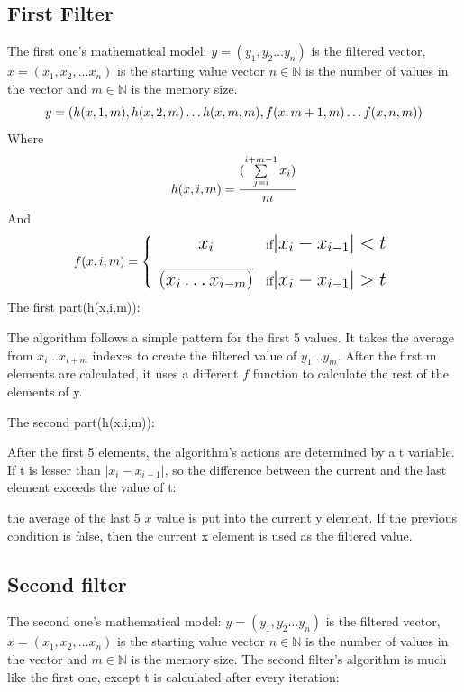\subsection{First Filter}
The first one's mathematical model:
$y=(y_1,y_2\ldots y_n)$ is the filtered vector,$x=(x_1,x_2,\ldots x_n)$ is the starting value vector $ n\in \mathbb{N} $ is the number of values in the vector and $m \in \mathbb{N}$ is the memory size.
\begin{equation}\fontsize{15pt}{2}
y=(h(x,1,m),h(x,2,m)\ldots h(x,m,m), f(x,m+1,m)\ldots f(x,n,m))
\end{equation}
Where
\begin{equation}\fontsize{15pt}{2}
h(x,i,m)={(\sum\limits_{j=i}^{i+m-1}x_i) \over m}
\end{equation}
And
\begin{equation}\fontsize{15pt}{2}
f(x,i,m)=
\left\{
	\begin{array}{ccc}
	x_i & \mbox{if} |x_i-x_{i-1}|<t \\
	\\
	\overline{(x_i\ldots x_{i-m})} & \mbox{if} |x_i-x_{i-1}|>t
	\end{array}
\right.
\end{equation}           
The first part(h(x,i,m)):


The algorithm follows a simple pattern for the first 5 values. It takes the average from $x_i\ldots x_{i+m}$ indexes to create the filtered value of $y_1\ldots y_m$.
After the first m elements are calculated, it uses a different $f$ function to calculate the rest of the elements of y. 


The second  part(h(x,i,m)):

After the first 5 elements, the algorithm's actions are determined by a t variable.
If t is lesser than $|x_i-x_{i-1}|$, so the difference between the current and the last element exceeds the value of t:

the average of the last 5 $x$ value is put into the current y element.
If the previous condition is false, then the current x element is used as the filtered value.



\subsection{Second filter}
The second one's mathematical model:
$y=(y_1,y_2\ldots y_n)$ is the filtered vector,$x=(x_1,x_2,\ldots x_n)$ is the starting value vector $ n\in \mathbb{N} $ is the number of values in the vector and $m \in \mathbb{N}$ is the memory size.
The second filter's algorithm is much like the first one, except t is calculated after every iteration: 


